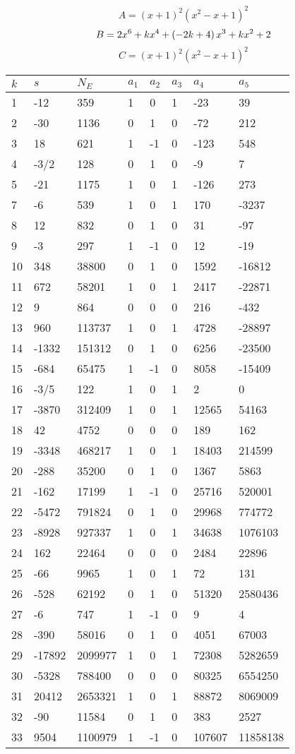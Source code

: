 \documentclass{amsart}
\begin{document}
$$A=(x
 + 1)^{2}(x^2
 - x
 + 1)^{2}$$
$$B=2\*x^6
 + k\*x^4
 + \left(-2\*k
 + 4\right) \*x^3
 + k\*x^2
 + 2$$
$$C=(x
 + 1)^{2}(x^2
 - x
 + 1)^{2}$$
\begin{longtable}{|l|l|l|lllll|}
\hline
$k$ & $s$ & $N_E$ & $a_1$ & $a_2$ & $a_3$ & $a_4$ & $a_5$\\
\hline
1&-12&359&1&0&1&-23&39\\
2&-30&1136&0&1&0&-72&212\\
3&18&621&1&-1&0&-123&548\\
4&-3/2&128&0&1&0&-9&7\\
5&-21&1175&1&0&1&-126&273\\
7&-6&539&1&0&1&170&-3237\\
8&12&832&0&1&0&31&-97\\
9&-3&297&1&-1&0&12&-19\\
10&348&38800&0&1&0&1592&-16812\\
11&672&58201&1&0&1&2417&-22871\\
12&9&864&0&0&0&216&-432\\
13&960&113737&1&0&1&4728&-28897\\
14&-1332&151312&0&1&0&6256&-23500\\
15&-684&65475&1&-1&0&8058&-15409\\
16&-3/5&122&1&0&1&2&0\\
17&-3870&312409&1&0&1&12565&54163\\
18&42&4752&0&0&0&189&162\\
19&-3348&468217&1&0&1&18403&214599\\
20&-288&35200&0&1&0&1367&5863\\
21&-162&17199&1&-1&0&25716&520001\\
22&-5472&791824&0&1&0&29968&774772\\
23&-8928&927337&1&0&1&34638&1076103\\
24&162&22464&0&0&0&2484&22896\\
25&-66&9965&1&0&1&72&131\\
26&-528&62192&0&1&0&51320&2580436\\
27&-6&747&1&-1&0&9&4\\
28&-390&58016&0&1&0&4051&67003\\
29&-17892&2099977&1&0&1&72308&5282659\\
30&-5328&788400&0&0&0&80325&6554250\\
31&20412&2653321&1&0&1&88872&8069009\\
32&-90&11584&0&1&0&383&2527\\
33&9504&1100979&1&-1&0&107607&11858138\\

\end{longtable}
\end{document}
